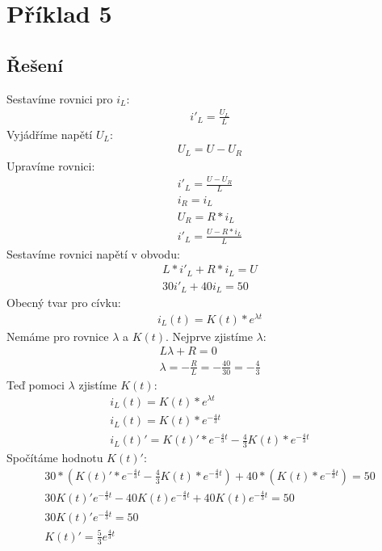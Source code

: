 \section{Příklad 5}
\makebox[\linewidth]{\rule{\textwidth}{0.5pt}}
\subsection{Řešení}
Sestavíme rovnici pro $i_L$:
\begin{gather*}
i'_L = \frac{U_L}{L}
\end{gather*}
Vyjádříme napětí $U_L$:
\begin{gather*}
U_L = U - U_R
\end{gather*}
Upravíme rovnici:
\begin{gather*}
i'_L = \frac{U-U_R}{L}\\
i_R = i_L \\
U_R = R * i_L\\
i'_L = \frac{U-R * i_L}{L}
\end{gather*}
Sestavíme rovnici napětí v obvodu:
\begin{gather*}
L * i'_L + R * i_L = U\\
30i'_L + 40i_L = 50
\end{gather*}
Obecný tvar pro cívku:
\begin{gather*}
i_L(t)=K(t) * e^{\lambda t}
\end{gather*}
Nemáme pro rovnice $\lambda$ a $K(t)$. Nejprve zjistíme $\lambda$:
\begin{gather*}
L\lambda+R = 0 \\
\lambda = -\frac{R}{L} = -\frac{40}{30} = -\frac{4}{3}
\end{gather*}
Teď pomoci $\lambda$ zjistíme $K(t)$:
\begin{gather*}
i_L(t) = K(t) * e^{\lambda t} \\
i_L(t) = K(t) * e^{-\frac{4}{3}t} \\
i_L(t)' = K(t)' *  e^{-\frac{4}{3}t} - \frac{4}{3}K(t) * e^{-\frac{4}{3}t}
\end{gather*}
Spočítáme hodnotu $K(t)'$:
\begin{gather*}
30 * (K(t)' *  e^{-\frac{4}{3}t} - \frac{4}{3}K(t) * e^{-\frac{4}{3}t}) + 40 * (K(t) * e^{-\frac{4}{3}t}) = 50 \\
30K(t)'e^{-\frac{4}{3}t} - 40K(t)e^{-\frac{4}{3}t} + 40K(t)e^{-\frac{4}{3}t} = 50 \\
30K(t)'e^{-\frac{4}{3}t} = 50 \\
K(t)' = \frac{5}{3}e^{\frac{4}{3}t}
\end{gather*}
